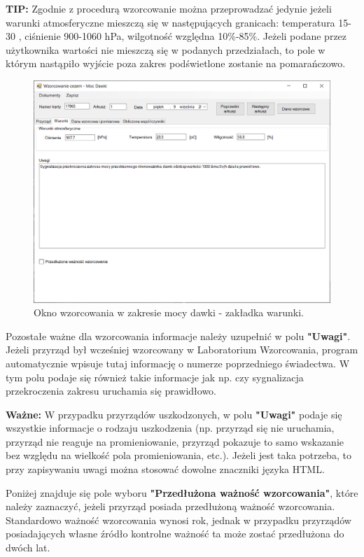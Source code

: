 \textbf{TIP:} Zgodnie z procedurą wzorcowanie można przeprowadzać jedynie jeżeli warunki atmosferyczne mieszczą się w następujących granicach: temperatura 15-30 \textcelsius, ciśnienie 900-1060 hPa,  wilgotność względna 10\%-85\%. Jeżeli podane przez użytkownika wartości nie mieszczą się w podanych przedziałach, to pole w którym nastąpiło wyjście poza zakres podświetlone zostanie na pomarańczowo.


\begin{figure}[htb]
	\centering
	\includegraphics[width=\columnwidth]{obrazki/Wzorcowanie/moc_dawki/warunki.png}
	\caption{Okno wzorcowania w zakresie mocy dawki - zakładka warunki.}
	\label{mocWarunki}
\end{figure}

Pozostałe ważne dla wzorcowania informacje należy uzupełnić w polu \textbf{"Uwagi"}. Jeżeli przyrząd był wcześniej wzorcowany w Laboratorium Wzorcowania, program automatycznie wpisuje tutaj informację o numerze poprzedniego świadectwa. W tym polu podaje się również takie informacje jak np. czy sygnalizacja przekroczenia zakresu uruchamia się prawidłowo. 

\textbf{Ważne:} W przypadku przyrządów uszkodzonych, w polu \textbf{"Uwagi"} podaje się wszystkie informacje o rodzaju uszkodzenia (np. przyrząd się nie uruchamia, przyrząd nie reaguje na promieniowanie, przyrząd pokazuje to samo wskazanie bez względu na wielkość pola promieniowania, etc.). Jeżeli jest taka potrzeba, to przy zapisywaniu uwagi można stosować dowolne znaczniki języka HTML.

Poniżej znajduje się pole wyboru \textbf{"Przedłużona ważność wzorcowania"}, które należy zaznaczyć, jeżeli przyrząd posiada przedłużoną ważność wzorcowania. Standardowo ważność wzorcowania wynosi rok, jednak w przypadku przyrządów posiadających własne źródło kontrolne ważność ta może zostać przedłużona do dwóch lat.


